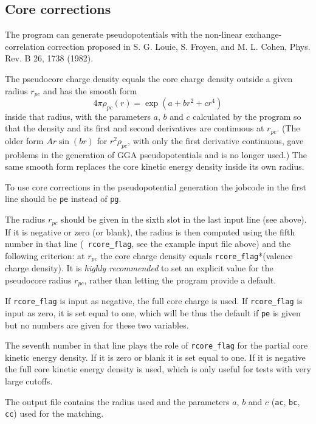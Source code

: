 \documentclass[11pt]{article}
\begin{document}
\subsection{Core corrections}
\label{sec:cc}

The program can generate pseudopotentials with the non-linear
exchange-correlation correction proposed in S. G. Louie, S. Froyen,
and M. L. Cohen, Phys. Rev. B 26, 1738 (1982).

The pseudocore charge density equals the core charge density
outside a given radius $r_{pc}$ and has the smooth form
$$
4 \pi \rho_{pc}(r) = \exp{(a + b r^2 +c r^4)}
$$
inside that radius, with the parameters $a$, $b$ and $c$ calculated by the program
so that the density and its first and second derivatives are continuous at $r_{pc}$.
(The older form $A r \sin(b r)$ for $r^2 \rho_{pc}$, with only the first derivative
continuous, gave problems in the generation of GGA pseudopotentials and is no longer used.)
The same smooth form replaces the core kinetic energy density inside its own radius.

To use core corrections in the pseudopotential generation
the jobcode in the first line should be {\tt pe} instead of {\tt pg}.

The radius $r_{pc}$ should be  given in the sixth slot in the last
input line (see above). If it is negative or zero (or blank), the
radius is then computed using the fifth number in that line ({\tt
rcore\_flag}, see the example input file above)
and the following criterion: at $r_{pc}$ the core charge density
equals {\tt rcore\_flag}*(valence charge density).
It is \textit{highly recommended} to set an explicit value for the pseudocore
radius $r_{pc}$, rather than letting the program provide a default.

If {\tt rcore\_flag} is input as negative, the full core charge is used.
If {\tt rcore\_flag} is input as zero, it is set equal to one, which will be
thus the default if {\tt pe} is given but no numbers are given for these
two variables.

The seventh number in that line plays the role of {\tt rcore\_flag}
for the partial core kinetic energy density.  If it is zero or blank
it is set equal to one.  If it is negative the full core kinetic energy
density is used, which is only useful for tests with very large cutoffs.

The output file contains the radius used and the parameters $a$, $b$ and $c$
(\texttt{ac}, \texttt{bc}, \texttt{cc}) used for the matching.
\end{document}
